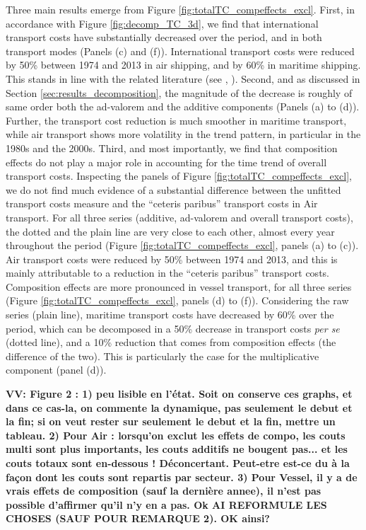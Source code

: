 \documentclass[a4paper,11pt]{article}
\begin{document}
Three main results emerge from Figure \ref{fig:totalTC_compeffects_excl}. First, in accordance with Figure \ref{fig:decomp_TC_3d}, we find that international transport costs have substantially decreased over the period, and in both transport modes (Panels (c) and (f)). International transport costs were reduced by 50\% between 1974 and 2013 in air shipping, and by 60\% in maritime shipping. This stands in line with the related literature (see \citealp{Hummels_1999}, \citealp{Lafourcade_Thisse}). Second, and as discussed in Section \ref{sec:results_decomposition}, the magnitude of the decrease is roughly of same order both the ad-valorem and the additive components (Panels (a) to (d)). Further, the transport cost reduction is much smoother in maritime transport, while air transport shows more volatility in the trend pattern, in particular in the 1980s and the 2000s.
Third, and most importantly, we find that composition effects do not play a major role in accounting for the time trend of overall transport costs. Inspecting the panels of Figure \ref{fig:totalTC_compeffects_excl}, we do not find much evidence of a substantial difference between the unfitted transport costs measure and the ``ceteris paribus'' transport costs in Air transport. For all three series (additive, ad-valorem and overall transport costs), the dotted and the plain line are very close to each other, almost every year throughout the period (Figure \ref{fig:totalTC_compeffects_excl}, panels (a) to (c)). Air transport costs were reduced by 50\% between 1974 and 2013, and this is mainly attributable to a reduction in the ``ceteris paribus'' transport costs. Composition effects are more pronounced in vessel transport, for all three series (Figure \ref{fig:totalTC_compeffects_excl}, panels (d) to (f)). Considering the raw series (plain line), maritime transport costs have decreased by 60\% over the period, which can be decomposed in a 50\% decrease in transport costs \textit{per se} (dotted line), and a 10\% reduction that comes from composition effects (the difference of the two). This is particularly the case for the multiplicative component (panel (d)).\smallskip

\textbf{VV: Figure 2 : 1) peu lisible en l’état. Soit on conserve ces graphs, et dans ce cas-la, on commente la dynamique, pas seulement le debut et la fin; si on veut rester sur seulement le debut et la fin, mettre un tableau. 2) Pour Air : lorsqu’on exclut les effets de compo, les couts multi sont plus importants, les couts additifs ne bougent pas... et les couts totaux sont en-dessous ! Déconcertant. Peut-etre est-ce du à la façon dont les couts sont repartis par secteur. 3) Pour Vessel, il y a de vrais effets de composition (sauf la dernière annee), il n’est pas possible d’affirmer qu’il n’y en a pas. Ok AI REFORMULE LES CHOSES (SAUF POUR REMARQUE 2). OK ainsi? }
\end{document}
